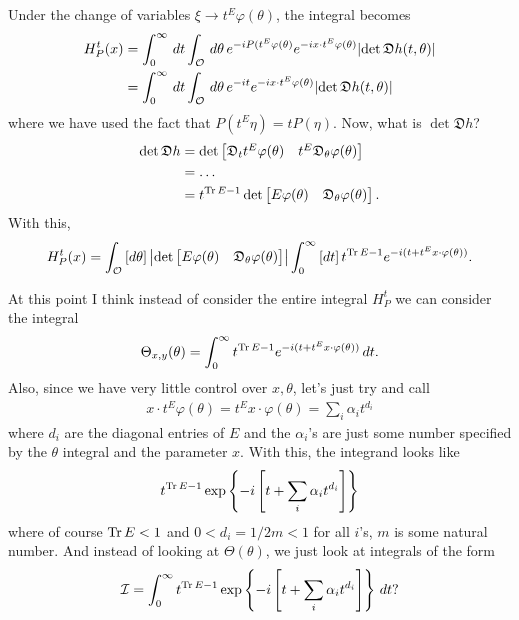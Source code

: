 \documentclass{article}
\theoremstyle{definition}
\newcommand{\al}{\alpha}
\newcommand{\lb}{\left[}
\newcommand{\rb}{\right]}
\newcommand{\lc}{\left\{}
\newcommand{\rc}{\right\}}
\begin{document}
Under the change of variables $\xi \to t^E \varphi(\theta)$, the integral becomes
\begin{align*}
    H^t_P(x) &= \int_0^\infty\,dt \int_\mathcal{O}\, d\theta\, e^{-iP(t^E \varphi(\theta)} e^{-i x\cdot t^E \varphi(\theta)}\abs{\det \mathfrak{D}h(t,\theta)}\\
    &= \int_0^\infty\,dt \int_\mathcal{O}\, d\theta\, e^{-it} e^{-i x\cdot t^E \varphi(\theta)}\abs{\det \mathfrak{D}h(t,\theta)}
\end{align*}
where we have used the fact that $P(t^E\eta) = tP(\eta)$. Now, what is $\det \mathfrak{D}h$?
\begin{align*}
    \det\mathfrak{D}h 
    &= \det \begin{bmatrix}
    \mathfrak{D}_t t^E \varphi(\theta) & t^E \mathfrak{D}_\theta \varphi(\theta)
    \end{bmatrix}\\
    &= \dots \\
    &= t^{\Tr E - 1}\det\begin{bmatrix}
    E\varphi(\theta) & \mathfrak{D}_\theta \varphi(\theta)
    \end{bmatrix}.
\end{align*}
With this, 
\begin{align*}
    H_P^t(x) = \int_\mathcal{O}\, [d\theta]\, \abs{\det\begin{bmatrix}
    E\varphi(\theta) & \mathfrak{D}_\theta \varphi(\theta)
    \end{bmatrix}} \int_0^\infty\,[dt]\, t^{\Tr E - 1} e^{-i(t + t^E x\cdot \varphi(\theta))}.
\end{align*}


At this point I think instead of consider the entire integral $H_P^t$ we can consider the integral
\begin{align*}
    \Theta_{x,y}(\theta) = \int_0^\infty t^{\Tr E - 1} e^{-i(t + t^E x\cdot \varphi(\theta))}\,dt.
\end{align*}
Also, since we have very little control over $x,\theta$, let's just try and call
\begin{align}
    x\cdot t^E \varphi(\theta) = t^E x\cdot \varphi(\theta) = \sum_{i} \al_i t^{d_i} 
\end{align}
where $d_i$ are the diagonal entries of $E$ and the $\al_i$'s are just some number specified by the $\theta$ integral and the parameter $x$. With this, the integrand looks like
\begin{align}
    t^{\Tr E - 1}\exp\lc -i\lb t + \sum_{i} \al_i t^{d_i} \rb \rc
\end{align}
where of course $\Tr E < 1$ and $0 < d_i = 1/2m < 1$ for all $i$'s, $m$ is some natural number. And instead of looking at $\Theta(\theta)$, we just look at integrals of the form
\begin{align*}
    \mathcal{I} = \int_0^\infty t^{\Tr E - 1}\exp\lc -i\lb t + \sum_{i} \al_i t^{d_i} \rb \rc\,dt?
\end{align*}
\end{document}
